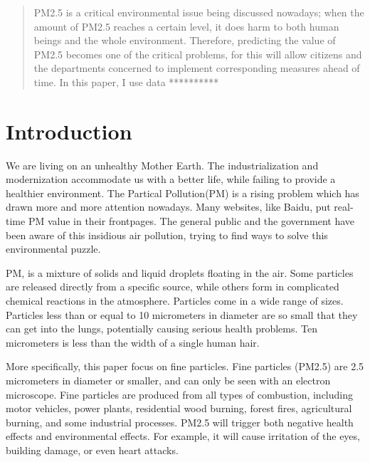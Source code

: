 \documentclass{sig-alternate}
\begin{document}
\date{5 July 2015}


\maketitle
\begin{abstract}
PM2.5 is a critical environmental issue being discussed nowadays; when the amount of PM2.5 reaches a certain level, it does harm to both human beings and the whole environment. Therefore, predicting the value of PM2.5 becomes one of the critical problems, for this will allow citizens and the departments concerned to implement corresponding measures ahead of time. In this paper, I use data **********
\end{abstract}




\section{Introduction}
We are living on an unhealthy Mother Earth. The industrialization and modernization accommodate us with a better life, while failing to provide a healthier environment. The Partical Pollution(PM) is a rising problem which has drawn more and more attention nowadays. Many websites, like Baidu, put real-time PM value in their frontpages. The general public and the government have been aware of this insidious air pollution, trying to find ways to solve this environmental puzzle.

PM, is a mixture of solids and liquid droplets floating in the air\cite{pm}. Some particles are released directly from a specific source, while others form in complicated chemical reactions in the atmosphere. Particles come in a wide range of sizes. Particles less than or equal to 10 micrometers in diameter are so small that they can get into the lungs, potentially causing serious health problems. Ten micrometers is less than the width of a single human hair.

More specifically, this paper focus on fine particles. Fine particles (PM2.5) are 2.5 micrometers in diameter or smaller, and can only be seen with an electron microscope. Fine particles are produced from all types of combustion, including motor vehicles, power plants, residential wood burning, forest fires, agricultural burning, and some industrial processes. PM2.5 will trigger both negative health effects and environmental effects. For example, it will cause irritation of the eyes, building damage, or even heart attacks.
\end{document}
